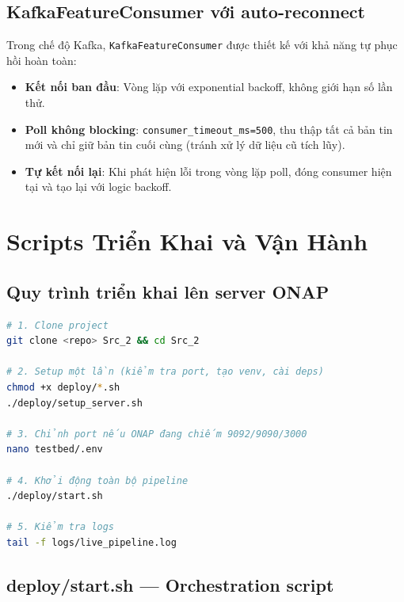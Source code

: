 \documentclass[12pt,a4paper]{article}
\begin{document}
\subsection{KafkaFeatureConsumer với auto-reconnect}

Trong chế độ Kafka, \texttt{KafkaFeatureConsumer} được thiết kế với khả năng tự phục hồi hoàn toàn:

\begin{itemize}[leftmargin=2em]
\item \textbf{Kết nối ban đầu}: Vòng lặp với exponential backoff, không giới hạn số lần thử.
\item \textbf{Poll không blocking}: \texttt{consumer\_timeout\_ms=500}, thu thập tất cả bản tin mới và chỉ giữ bản tin cuối cùng (tránh xử lý dữ liệu cũ tích lũy).
\item \textbf{Tự kết nối lại}: Khi phát hiện lỗi trong vòng lặp poll, đóng consumer hiện tại và tạo lại với logic backoff.
\end{itemize}

\section{Scripts Triển Khai và Vận Hành}

\subsection{Quy trình triển khai lên server ONAP}

\begin{lstlisting}[language=bash,caption={Triển khai PAD-ONAP Phase 1 lên server}]
# 1. Clone project
git clone <repo> Src_2 && cd Src_2

# 2. Setup một lần (kiểm tra port, tạo venv, cài deps)
chmod +x deploy/*.sh
./deploy/setup_server.sh

# 3. Chỉnh port nếu ONAP đang chiếm 9092/9090/3000
nano testbed/.env

# 4. Khởi động toàn bộ pipeline
./deploy/start.sh

# 5. Kiểm tra logs
tail -f logs/live_pipeline.log
\end{lstlisting}

\subsection{deploy/start.sh --- Orchestration script}
\end{document}
